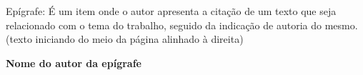 Epígrafe: É um item onde o autor apresenta a citação de um texto que seja relacionado com o tema do trabalho, seguido da indicação de autoria do mesmo.
(texto iniciando do meio da página alinhado à direita)

\bigskip
\textbf{Nome do autor da epígrafe}
